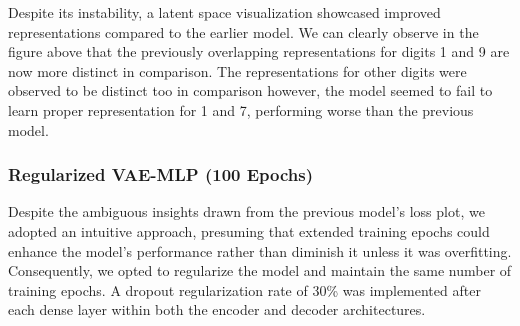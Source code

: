 \documentclass[12pt]{article}
\begin{document}
Despite its instability, a latent space visualization showcased improved representations compared to the earlier model. We can clearly observe in the figure above that the previously overlapping representations for digits 1 and 9 are now more distinct in comparison. The representations for other digits were observed to be distinct too in comparison however, the model seemed to fail to learn proper representation for 1 and 7, performing worse than the previous model.

\subsubsection{Regularized VAE-MLP (100 Epochs)}
Despite the ambiguous insights drawn from the previous model's loss plot, we adopted an intuitive approach, presuming that extended training epochs could enhance the model's performance rather than diminish it unless it was overfitting. Consequently, we opted to regularize the model and maintain the same number of training epochs. A dropout regularization rate of 30\% was implemented after each dense layer within both the encoder and decoder architectures.
\end{document}
